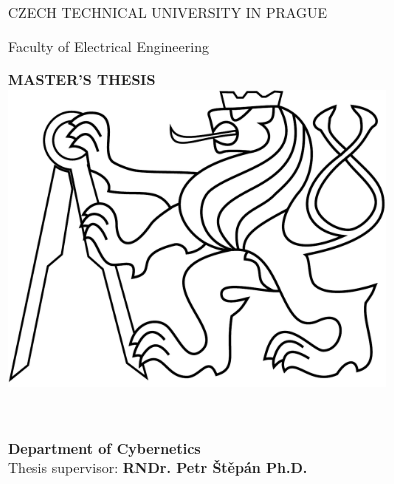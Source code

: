 \begin{titlepage}
\begin{center}

{\Large CZECH TECHNICAL UNIVERSITY IN PRAGUE}
\vskip 10pt

\vskip 8pt
{\Large Faculty of Electrical Engineering}
 
\vspace{50pt}
{\Huge\bf MASTER'S THESIS}\\
\vspace{40pt}
\includegraphics[width=10cm]{fig/lev.pdf}

\vspace{40pt}
{\Large\rm \Author } \\
\vspace{20pt}
{\Large\bf \Title}

\vspace{60pt}
{\bf Department of Cybernetics}\\
\vspace{5pt}   
{Thesis supervisor: {\bf RNDr. Petr Štěpán Ph.D.}}

\vspace{30pt}
\end{center}
\end{titlepage}
